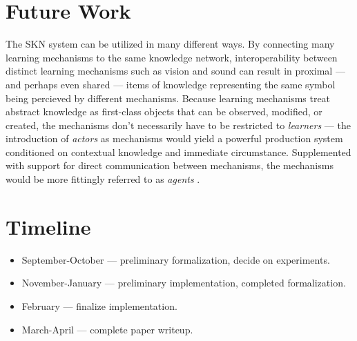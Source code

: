 \documentclass[11pt,letterpaper]{article}
\begin{document}
\section{Future Work}

The SKN system can be utilized in many different ways. By connecting many
learning mechanisms to the same knowledge network, interoperability between
distinct learning mechanisms such as vision and sound can result in proximal
--- and perhaps even shared --- items of knowledge representing the same
symbol being percieved by different mechanisms. Because learning mechanisms
treat abstract knowledge as first-class objects that can be observed,
modified, or created, the mechanisms don't necessarily have to be restricted
to \emph{learners} --- the introduction of \emph{actors} as mechanisms would
yield a powerful production system conditioned on contextual knowledge and
immediate circumstance. Supplemented with support for direct communication
between mechanisms, the mechanisms would be more fittingly referred to as
\emph{agents} \cite{minsky88}.


\section{Timeline}

\begin{itemize}
  \item September-October --- preliminary formalization, decide on
    experiments.
  \item November-January --- preliminary implementation, completed
    formalization.
  \item February --- finalize implementation.
  \item March-April --- complete paper writeup.
\end{itemize}
\end{document}
